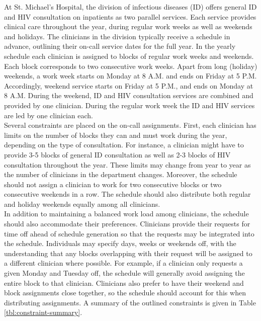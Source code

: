 At St. Michael's Hospital, the division of infectious diseases (ID) offers general ID and HIV consultation on inpatients as two parallel services. Each service provides clinical care throughout the year, during regular work weeks as well as weekends and holidays. The clinicians in the division typically receive a schedule in advance, outlining their on-call service dates for the full year. In the yearly schedule each clinician is assigned to blocks of regular work weeks and weekends. Each block corresponds to two consecutive work weeks. Apart from long (holiday) weekends, a work week starts on Monday at 8 A.M. and ends on Friday at 5 P.M. Accordingly, weekend service starts on Friday at 5 P.M., and ends on Monday at 8 A.M. During the weekend, ID and HIV consultation services are combined and provided by one clinician. During the regular work week the ID and HIV services are led by one clinician each. \\

Several constraints are placed on the on-call assignments. First, each clinician has limits on the number of blocks they can and must work during the year, depending on the type of consultation. For instance, a clinician might have to provide 3-5 blocks of general ID consultation as well as 2-3 blocks of HIV consultation throughout the year. These limits may change from year to year as the number of clinicians in the department changes. Moreover, the schedule should not assign a clinician to work for two consecutive blocks or two consecutive weekends in a row. The schedule should also distribute both regular and holiday weekends equally among all clinicians. \\

In addition to maintaining a balanced work load among clinicians, the schedule should also accommodate their preferences. Clinicians provide their requests for time off ahead of schedule generation so that the requests may be integrated into the schedule. Individuals may specify days, weeks or weekends off, with the understanding that any blocks overlapping with their request will be assigned to a different clinician where possible. For example, if a clinician only requests a given Monday and Tuesday off, the schedule will generally avoid assigning the entire block to that clinician. Clinicians also prefer to have their weekend and block assignments close together, so the schedule should account for this when distributing assignments. A summary of the outlined constraints is given in Table \ref{tbl:constraint-summary}.

